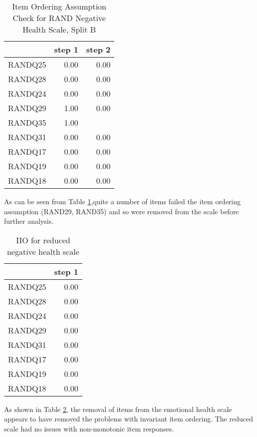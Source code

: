 \documentclass{article}
\begin{document}
\begin{table}[ht]
\centering
\begin{tabular}{rrr}
  \hline
 & step 1 & step 2 \\ 
  \hline
RANDQ25 & 0.00 & 0.00 \\ 
  RANDQ28 & 0.00 & 0.00 \\ 
  RANDQ24 & 0.00 & 0.00 \\ 
  RANDQ29 & 1.00 & 0.00 \\ 
  RANDQ35 & 1.00 &  \\ 
  RANDQ31 & 0.00 & 0.00 \\ 
  RANDQ17 & 0.00 & 0.00 \\ 
  RANDQ19 & 0.00 & 0.00 \\ 
  RANDQ18 & 0.00 & 0.00 \\ 
   \hline
\end{tabular}
\caption{Item Ordering Assumption Check for RAND Negative Health Scale, Split B} 
\label{tab:randneghealthitemord}
\end{table}
As can be seen from Table \ref{tab:randneghealthitemord},quite a number of items failed the item ordering assumption (RAND29, RAND35) and so were removed from the scale before further analysis. 

\begin{table}[ht]
\centering
\begin{tabular}{rr}
  \hline
 & step 1 \\ 
  \hline
RANDQ25 & 0.00 \\ 
  RANDQ28 & 0.00 \\ 
  RANDQ24 & 0.00 \\ 
  RANDQ29 & 0.00 \\ 
  RANDQ31 & 0.00 \\ 
  RANDQ17 & 0.00 \\ 
  RANDQ19 & 0.00 \\ 
  RANDQ18 & 0.00 \\ 
   \hline
\end{tabular}
\caption{IIO for reduced negative health scale} 
\label{tab:randneghealth2biio}
\end{table}
As shown in Table \ref{tab:randneghealth2biio}, the removal of items from the emotional health scale appears to have removed the problems with invariant item ordering. The reduced scale had no issues with non-monotonic item responses. 
\end{document}
